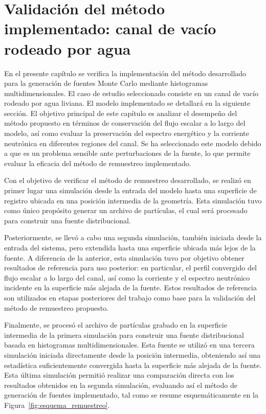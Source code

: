 \chapter{Validación del método implementado: canal de vacío rodeado por agua}

En el presente capítulo se verifica la implementación del método desarrollado para la generación de fuentes Monte Carlo mediante histogramas multidimensionales. El caso de estudio seleccionado consiste en un canal de vacío rodeado por agua liviana. El modelo implementado se detallará en la siguiente sección. El objetivo principal de este capítulo es analizar el desempeño del método propuesto en términos de conservación del flujo escalar a lo largo del modelo, así como evaluar la preservación del espectro energético y la corriente neutrónica en diferentes regiones del canal. Se ha seleccionado este modelo debido a que es un problema sensible ante perturbaciones de la fuente, lo que permite evaluar la eficacia del método de remuestreo implementado.

Con el objetivo de verificar el método de remuestreo desarrollado, se realizó en primer lugar una simulación desde la entrada del modelo hasta una superficie de registro ubicada en una posición intermedia de la geometría. Esta simulación tuvo como único propósito generar un archivo de partículas, el cual será procesado para construir una fuente distribucional.

Posteriormente, se llevó a cabo una segunda simulación, también iniciada desde la entrada del sistema, pero extendida hasta una superficie ubicada más lejos de la fuente. A diferencia de la anterior, esta simulación tuvo por objetivo obtener resultados de referencia para uso posterior: en particular, el perfil convergido del flujo escalar a lo largo del canal, así como la corriente y el espectro neutrónico incidente en la superficie más alejada de la fuente. Estos resultados de referencia son utilizados en etapas posteriores del trabajo como base para la validación del método de remuestreo propuesto.

Finalmente, se procesó el archivo de partículas grabado en la superficie intermedia de la primera simulación para construir una fuente distribucional basada en histogramas multidimensionales. Esta fuente se utilizó en una tercera simulación iniciada directamente desde la posición intermedia, obteniendo así una estadística suficientemente convergida hasta la superficie más alejada de la fuente. Esta última simulación permitió realizar una comparación directa con los resultados obtenidos en la segunda simulación, evaluando así el método de generación de fuentes implementado, tal como se resume esquemáticamente en la Figura~\ref{fig:esquema_remuestreo}.

